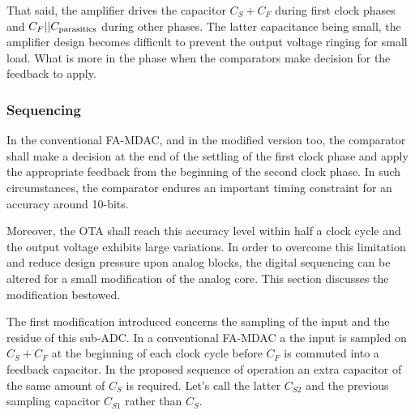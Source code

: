 That said, the amplifier drives the capacitor $C_S+C_F$ during first clock phases and $C_F||C_{\rm parasitics}$ during other phases. The latter capacitance being small, the amplifier design becomes difficult to prevent the output voltage ringing for small load. What is more in the phase when the comparators make decision for the feedback to apply.

	\subsubsection{Sequencing}
In the conventional FA-MDAC, and in the modified version too, the comparator shall make a decision at the end of the settling of the first clock phase and apply the appropriate feedback from the beginning of the second clock phase. In such circumstances, the comparator endures an important timing constraint for an accuracy around 10-bits.

Moreover, the OTA shall reach this accuracy level within half a clock cycle and the output voltage exhibits large variations. In order to overcome this limitation and reduce design pressure upon analog blocks, the digital sequencing can be altered for a small modification of the analog core. This section discusses the modification bestowed.

The first modification introduced concerns the sampling of the input and the residue of this sub-ADC\@. In a conventional FA-MDAC a the input is sampled on \(C_S + C_F\) at the beginning of each clock cycle before \(C_F\) is commuted into a feedback capacitor. In the proposed sequence of operation an extra capacitor of the same amount of \(C_S\) is required. Let's call the latter \(C_{S2}\) and the previous sampling capacitor \(C_{S1}\) rather than \(C_S\).

